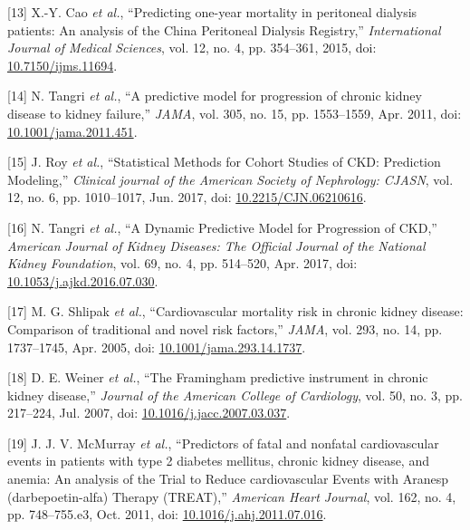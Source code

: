 \documentclass[
]{article}
\newenvironment{cslreferences}%
  {}%
  {\par}
\begin{document}
\begin{cslreferences}
\leavevmode\hypertarget{ref-cao_predicting_2015}{}%
{[}13{]} X.-Y. Cao \emph{et al.}, ``Predicting one-year mortality in peritoneal dialysis patients: An analysis of the China Peritoneal Dialysis Registry,'' \emph{International Journal of Medical Sciences}, vol. 12, no. 4, pp. 354--361, 2015, doi: \href{https://doi.org/10.7150/ijms.11694}{10.7150/ijms.11694}.

\leavevmode\hypertarget{ref-tangri_predictive_2011}{}%
{[}14{]} N. Tangri \emph{et al.}, ``A predictive model for progression of chronic kidney disease to kidney failure,'' \emph{JAMA}, vol. 305, no. 15, pp. 1553--1559, Apr. 2011, doi: \href{https://doi.org/10.1001/jama.2011.451}{10.1001/jama.2011.451}.

\leavevmode\hypertarget{ref-roy_statistical_2017}{}%
{[}15{]} J. Roy \emph{et al.}, ``Statistical Methods for Cohort Studies of CKD: Prediction Modeling,'' \emph{Clinical journal of the American Society of Nephrology: CJASN}, vol. 12, no. 6, pp. 1010--1017, Jun. 2017, doi: \href{https://doi.org/10.2215/CJN.06210616}{10.2215/CJN.06210616}.

\leavevmode\hypertarget{ref-tangri_dynamic_2017}{}%
{[}16{]} N. Tangri \emph{et al.}, ``A Dynamic Predictive Model for Progression of CKD,'' \emph{American Journal of Kidney Diseases: The Official Journal of the National Kidney Foundation}, vol. 69, no. 4, pp. 514--520, Apr. 2017, doi: \href{https://doi.org/10.1053/j.ajkd.2016.07.030}{10.1053/j.ajkd.2016.07.030}.

\leavevmode\hypertarget{ref-shlipak_cardiovascular_2005}{}%
{[}17{]} M. G. Shlipak \emph{et al.}, ``Cardiovascular mortality risk in chronic kidney disease: Comparison of traditional and novel risk factors,'' \emph{JAMA}, vol. 293, no. 14, pp. 1737--1745, Apr. 2005, doi: \href{https://doi.org/10.1001/jama.293.14.1737}{10.1001/jama.293.14.1737}.

\leavevmode\hypertarget{ref-weiner_framingham_2007}{}%
{[}18{]} D. E. Weiner \emph{et al.}, ``The Framingham predictive instrument in chronic kidney disease,'' \emph{Journal of the American College of Cardiology}, vol. 50, no. 3, pp. 217--224, Jul. 2007, doi: \href{https://doi.org/10.1016/j.jacc.2007.03.037}{10.1016/j.jacc.2007.03.037}.

\leavevmode\hypertarget{ref-mcmurray_predictors_2011}{}%
{[}19{]} J. J. V. McMurray \emph{et al.}, ``Predictors of fatal and nonfatal cardiovascular events in patients with type 2 diabetes mellitus, chronic kidney disease, and anemia: An analysis of the Trial to Reduce cardiovascular Events with Aranesp (darbepoetin-alfa) Therapy (TREAT),'' \emph{American Heart Journal}, vol. 162, no. 4, pp. 748--755.e3, Oct. 2011, doi: \href{https://doi.org/10.1016/j.ahj.2011.07.016}{10.1016/j.ahj.2011.07.016}.


\end{cslreferences}
\end{document}
